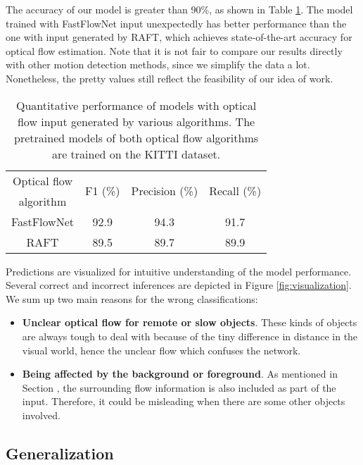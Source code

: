 \documentclass[10pt, a4paper, twocolumn]{article}
\begin{document}
    The accuracy of our model is greater than 90\%, as shown in Table \ref{tab:result}. The model trained with FastFlowNet input unexpectedly has better performance than the one with input generated by RAFT, which achieves state-of-the-art accuracy for optical flow estimation. Note that it is not fair to compare our results directly with other motion detection methods, since we simplify the data a lot. Nonetheless, the pretty values still reflect the feasibility of our idea of work.
    
    \begin{table}[t!]
    \caption{Quantitative performance of models with optical flow input generated by various algorithms. The pretrained models of both optical flow algorithms are trained on the KITTI \cite{Geiger2013IJRR} dataset.}
    \label{tab:result}
    \centering
    \begin{tabular}{c c c c}
        \hline
        Optical flow & \multirow{2}{3.5em}{\centering F1 (\%)} & \multirow{2}{6em}{\centering Precision (\%)} & \multirow{2}{5em}{\centering Recall (\%)} \\ algorithm & \\
        \hline\hline    
        FastFlowNet & 92.9 & 94.3 & 91.7 \\
        \hline
        RAFT & 89.5 & 89.7 & 89.9 \\
        \hline
    \end{tabular}
    \end{table}
    
    Predictions are visualized for intuitive understanding of the model performance. Several correct and incorrect inferences are depicted in Figure \ref{fig:visualization}. We sum up two main reasons for the wrong classifications:
    
    \begin{itemize}[noitemsep, topsep=0pt]
        \item \textbf{Unclear optical flow for remote or slow objects}. These kinds of objects are always tough to deal with because of the tiny difference in distance in the visual world, hence the unclear flow which confuses the network.
        \item \textbf{Being affected by the background or foreground}. As mentioned in Section , the surrounding flow information is also included as part of the input. Therefore, it could be misleading when there are some other objects involved. 
    \end{itemize}

\subsection{\normalsize Generalization}
\end{document}
